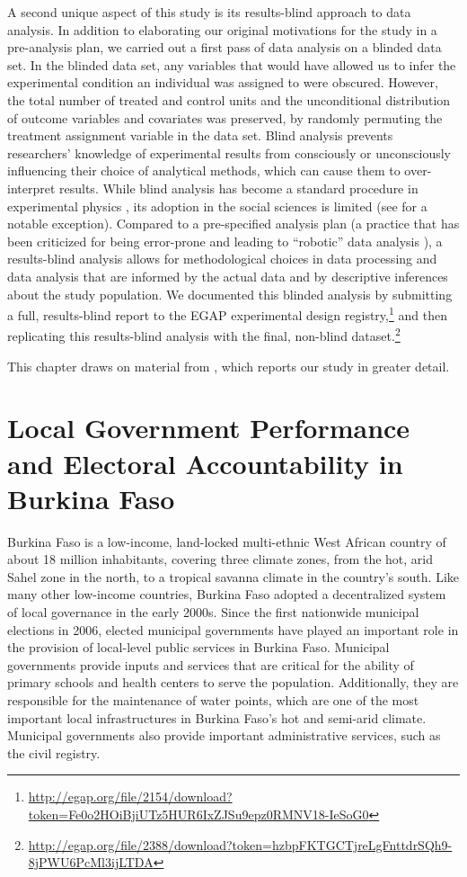 \documentclass[11pt]{article}
\begin{document}
A second unique aspect of this study is its results-blind approach to data analysis. In addition to elaborating our original motivations for the study in a pre-analysis plan, we carried out a first pass of data analysis on a blinded data set. In the blinded data set, any variables that would have allowed us to infer the experimental condition an individual was assigned to were obscured. However, the total number of treated and control units and the unconditional distribution of outcome variables and covariates was preserved, by randomly permuting the treatment assignment variable in the data set. Blind analysis prevents researchers' knowledge of experimental results from consciously or unconsciously influencing their choice of analytical methods, which can cause them to over-interpret results. While blind analysis has become a standard procedure in experimental physics \citep{Klein2005}, its adoption in the social sciences is limited (see \citet{Humphreys2013} for a notable exception). Compared to a pre-specified analysis plan (a practice that has been criticized for being error-prone and leading to ``robotic'' data analysis \citep{Gelman2013}), a results-blind analysis allows for methodological choices in data processing and data analysis that are informed by the actual data and by descriptive inferences about the study population. We documented this blinded analysis by submitting a full, results-blind report to the EGAP experimental design registry,\footnote{\url{http://egap.org/file/2154/download?token=Fe0o2HOiBjiUTz5HUR6IxZJSu9epz0RMNV18-IeSoG0}} and then replicating this results-blind analysis with the final, non-blind dataset.\footnote{\url{http://egap.org/file/2388/download?token=hzbpFKTGCTjreLgFnttdrSQh9-8jPWU6PcMl3ijLTDA}} 

This chapter draws on material from \citep{LierlHolmlundAmbiguity}, which reports our study in greater detail. 

\section{Local Government Performance and Electoral Accountability in Burkina Faso}

Burkina Faso is a low-income, land-locked multi-ethnic West African country of about 18 million inhabitants, covering three climate zones, from the hot, arid Sahel zone in the north, to a tropical savanna climate in the country's south. Like many other low-income countries, Burkina Faso adopted a decentralized system of local governance in the early 2000s. Since the first nationwide municipal elections in 2006, elected municipal governments have played an important role in the provision of local-level public services in Burkina Faso. Municipal governments provide inputs and services that are critical for the ability of primary schools and health centers to serve the population. Additionally, they are responsible for the maintenance of water points, which are one of the most important local infrastructures in Burkina Faso's hot and semi-arid climate. Municipal governments also provide important administrative services, such as the civil registry. 
\end{document}

